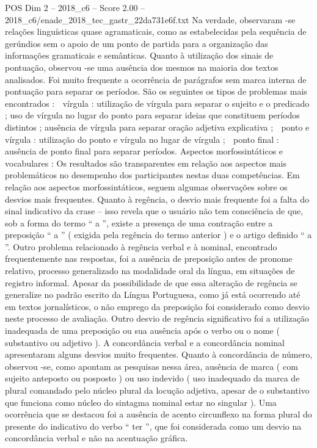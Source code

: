 \begin{textsample}{POS Dim 2 – 2018\_c6 – Score 2.00 – 2018\_c6/enade\_2018\_tec\_gastr\_22da731e6f.txt}
Na verdade, observaram -se relações linguísticas quase agramaticais, como as estabelecidas pela sequência de gerúndios sem o apoio de um ponto de partida para a organização das informações gramaticais e semânticas.
Quanto à utilização dos sinais de pontuação, observou -se uma ausência dos mesmos na maioria dos textos analisados.
Foi muito frequente a ocorrência de parágrafos sem marca interna de pontuação para separar os períodos.
São os seguintes os tipos de problemas mais encontrados :  vírgula : utilização de vírgula para separar o sujeito e o predicado ; uso de vírgula no lugar do ponto para separar ideias que constituem períodos distintos ; ausência de vírgula para separar oração adjetiva explicativa ;  ponto e vírgula : utilização do ponto e vírgula no lugar de vírgula ;  ponto final : ausência de ponto final para separar períodos.
Aspectos morfossintáticos e vocabulares : Os resultados são transparentes em relação aos aspectos mais problemáticos no desempenho dos participantes nestas duas competências.
Em relação aos aspectos morfossintáticos, seguem algumas observações sobre os desvios mais frequentes.
Quanto à regência, o desvio mais frequente foi a falta do sinal indicativo da crase – isso revela que o usuário não tem consciência de que, sob a forma do termo “ a ”, existe a presença de uma contração entre a preposição “ a ” ( exigida pela regência do termo anterior ) e o artigo definido “ a ”.
Outro problema relacionado à regência verbal e à nominal, encontrado frequentemente nas respostas, foi a ausência de preposição antes de pronome relativo, processo generalizado na modalidade oral da língua, em situações de registro informal.
Apesar da possibilidade de que essa alteração de regência se generalize no padrão escrito da Língua Portuguesa, como já está ocorrendo até em textos jornalísticos, o não emprego da preposição foi considerado como desvio neste processo de avaliação.
Outro desvio de regência significativo foi a utilização inadequada de uma preposição ou sua ausência após o verbo ou o nome ( substantivo ou adjetivo ).
A concordância verbal e a concordância nominal apresentaram alguns desvios muito frequentes.
Quanto à concordância de número, observou -se, como apontam as pesquisas nessa área, ausência de marca ( com sujeito anteposto ou posposto ) ou uso indevido ( uso inadequado da marca de plural comandado pelo núcleo plural da locução adjetiva, apesar de o substantivo que funciona como núcleo do sintagma nominal estar no singular ).
Uma ocorrência que se destacou foi a ausência de acento circunflexo na forma plural do presente do indicativo do verbo “ ter ”, que foi considerada como um desvio na concordância verbal e não na acentuação gráfica.

\end{textsample}
